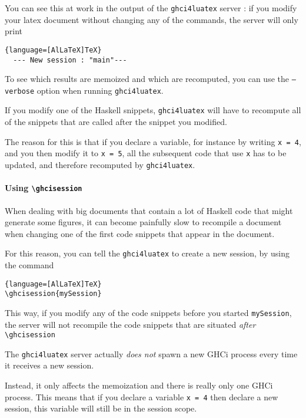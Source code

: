 \documentclass{article}
\begin{document}
You can see this at work in the output of the \texttt{ghci4luatex} server : if you modify your latex document without changing any of the commands, the server will only print

\begin{lstlisting}{language=[AlLaTeX]TeX}
  --- New session : "main"---
\end{lstlisting}

\begin{tipbox}
  To see which results are memoized and which are recomputed, you can use the \texttt{--verbose} option when running \texttt{ghci4luatex}.
\end{tipbox}


If you modify one of the Haskell snippets, \texttt{ghci4luatex} will have to recompute all of the snippets that are called after the snippet you modified.

The reason for this is that if you declare a variable, for instance by writing \texttt{x = 4}, and you then modify it to \texttt{x = 5}, all the subsequent code that use \texttt{x} has to be updated, and therefore recomputed by \texttt{ghci4luatex}.

\medskip

\paragraph{Using \texttt{\textbackslash ghcisession}}
When dealing with big documents that contain a lot of Haskell code that might generate some figures, it can become painfully slow to recompile a document when changing one of the first code snippets that appear in the document.

For this reason, you can tell the \texttt{ghci4luatex} to create a new session, by using the command

\begin{lstlisting}{language=[AlLaTeX]TeX}
\ghcisession{mySession}
\end{lstlisting}

This way, if you modify any of the code snippets before you started \texttt{mySession}, the server will not recompile the code snippets that are situated \emph{after} \texttt{\textbackslash ghcisession}

\begin{warningbox}
  The \texttt{ghci4luatex} server actually \emph{does not} spawn a new GHCi process every time it receives a new session.

  Instead, it only affects the memoization and there is really only one GHCi process. This means that if you declare a variable \texttt{x = 4} then declare a new session, this variable will still be in the session scope.
\end{warningbox}
\end{document}
